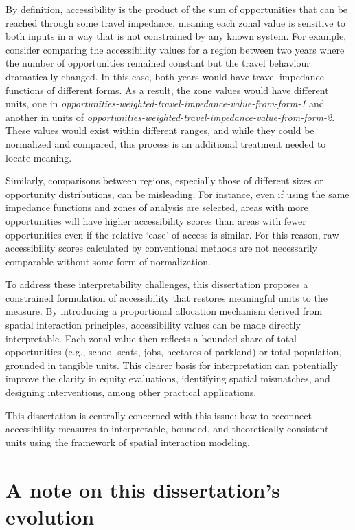 \documentclass[
11pt, %
oneside, %
english, %
singlespacing, %
]{macthesis} %
\begin{document}
By definition, accessibility is the product of the sum of opportunities that can be reached through some travel impedance, meaning each zonal value is sensitive to both inputs in a way that is not constrained by any known system. For example, consider comparing the accessibility values for a region between two years where the number of opportunities remained constant but the travel behaviour dramatically changed. In this case, both years would have travel impedance functions of different forms. As a result, the zone values would have different units, one in \emph{opportunities-weighted-travel-impedance-value-from-form-1} and another in units of \emph{opportunities-weighted-travel-impedance-value-from-form-2}. These values would exist within different ranges, and while they could be normalized and compared, this process is an additional treatment needed to locate meaning.

Similarly, comparisons between regions, especially those of different sizes or opportunity distributions, can be misleading. For instance, even if using the same impedance functions and zones of analysis are selected, areas with more opportunities will have higher accessibility scores than areas with fewer opportunities even if the relative `ease' of access is similar. For this reason, raw accessibility scores calculated by conventional methods are not necessarily comparable without some form of normalization.

To address these interpretability challenges, this dissertation proposes a constrained formulation of accessibility that restores meaningful units to the measure. By introducing a proportional allocation mechanism derived from spatial interaction principles, accessibility values can be made directly interpretable. Each zonal value then reflects a bounded share of total opportunities (e.g., school-seats, jobs, hectares of parkland) or total population, grounded in tangible units. This clearer basis for interpretation can potentially improve the clarity in equity evaluations, identifying spatial mismatches, and designing interventions, among other practical applications.

This dissertation is centrally concerned with this issue: how to reconnect accessibility measures to interpretable, bounded, and theoretically consistent units using the framework of spatial interaction modeling.

\section{A note on this dissertation's evolution}\label{a-note-on-this-dissertations-evolution}
\end{document}
